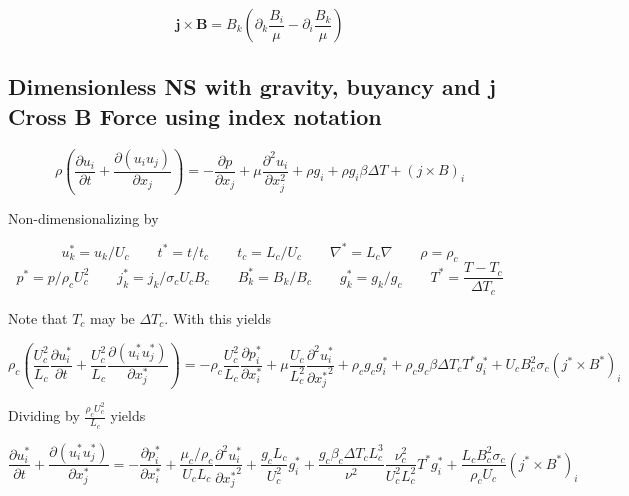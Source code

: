 \documentclass[11pt]{article}
\begin{document}
\begin{equation}
	\pmb{j} \times \pmb{B} = B_k 
	\left( \partial_k \frac{B_i}{\mu} - \partial_i \frac{B_k}{\mu} \right)
\end{equation}

\subsection{Dimensionless NS with gravity, buyancy and j Cross B Force using index notation}
\begin{equation}
	\rho 
	\left( 
	\frac{\partial u_i}{\partial t} + 
	\frac{\partial (u_i u_j)}{\partial x_j}
	\right) 
	= 
	- \frac{\partial p}{\partial x_j}
	+ \mu \frac{\partial^2 u_i}{\partial x_j^2}
	+ \rho g_i
	+ \rho g_i \beta \Delta T
	+ (j \times B)_i
\end{equation}

Non-dimensionalizing by

\begin{equation}
	u_k^* = u_k/U_c \qquad
	t^* = t/t_c \qquad
	t_c = L_c/U_c \qquad
	\nabla^* = L_c \nabla \qquad
	\rho = \rho_c
\end{equation}
\begin{equation}
	p^* = p/\rho_c U_c^2 \qquad
	j_k^* = j_k/ \sigma_c U_c B_c \qquad
	B_k^* = B_k/B_c \qquad
	g_k^* = g_k/g_c \qquad
	T^* = \frac{T - T_c}{\Delta T_c}
\end{equation}

Note that $T_c$ may be $\Delta T_c$. With this yields

\begin{equation}
	\rho_c 
	\left( 
	\frac{U_c^2}{L_c} 
	\frac{\partial u_i^*}{\partial t} + 
	\frac{U_c^2}{L_c} 
	\frac{\partial (u_i^* u_j^*)}{\partial x_j^*}
	\right) 
	= 
	- \rho_c \frac{U_c^2}{L_c} 
	\frac{\partial p_i^*}{\partial x_i^*}
	+ \mu \frac{U_c}{L_c^2} 
	\frac{\partial^2 u_i^*}{\partial {x_j^*}^2}
	+ \rho_c g_c g_i^* 
	+ \rho_c g_c \beta \Delta T_c T^*g_i^*
	+ U_c B_c^2 \sigma_c 
	(j^* \times B^*)_i
\end{equation}

Dividing by $\frac{\rho_c U_c^2}{L_c}$ yields

\begin{equation}
	\frac{\partial u_i^*}{\partial t} + 
	\frac{\partial (u_i^* u_j^*)}{\partial x_j^*}
	= 
	- \frac{\partial p_i^*}{\partial x_i^*}
	+ \frac{\mu_c/\rho_c}{U_c L_c} 
	\frac{\partial^2 u_i^*}{\partial {x_j^*}^2}
	+ \frac{g_c L_c}{U_c^2}
	g_i^*
	+ \frac{g_c \beta_c \Delta T_c L_c^3}{\nu^2} \frac{\nu_c^2}{U_c^2 L_c^2} T^*g_i^*
	+ \frac{L_c B_c^2 \sigma_c}{\rho_c U_c}
	(j^* \times B^*)_i
\end{equation}
\end{document}
